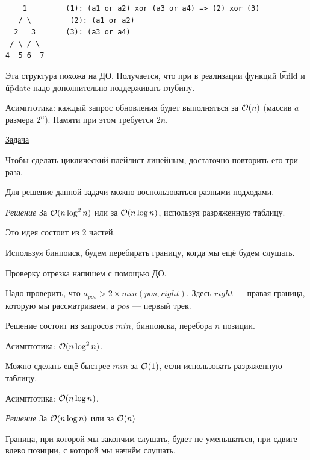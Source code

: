 \begin{verbatim}
    1         (1): (a1 or a2) xor (a3 or a4) => (2) xor (3)
   / \	       (2): (a1 or a2) 
  2   3       (3): (a3 or a4)
 / \ / \
4  5 6  7      
\end{verbatim}

Эта структура похожа на ДО. Получается, что при в реализации функций \t{build} и \t{update} надо дополнительно поддерживать глубину.

Асимптотика: каждый запрос обновления будет выполняться за $\mathcal{O}(n)$ (массив $a$ размера $2^n$). Памяти при этом требуется $2n$.

\pagebreak


\href{https://codeforces.com/problemset/problem/1237/D}{Задача}

Чтобы сделать циклический плейлист линейным, достаточно повторить его три раза.

Для решение данной задачи можно воспользоваться разными подходами. 

{\it Решение } За $ \mathcal{O}(n \log^2 n)$ или за $\mathcal{O}(n \log n)$, используя разряженную таблицу.

Это идея состоит из 2 частей.
\up \up
\begin{MyList}[0pt]
	\item Используя бинпоиск, будем перебирать границу, когда мы ещё будем слушать.
	\item Проверку отрезка напишем с помощью ДО.
	
	Надо проверить, что $a_{pos} > 2 \times min(pos, right)$. Здесь $right$ --- правая граница, которую мы рассматриваем, а $pos$ --- первый трек.
\end{MyList}
\up \up
Решение состоит из запросов $min$, бинпоиска, перебора $n$ позиции.

Асимптотика: $ \mathcal{O}(n \log^2 n)$.
\down

Можно сделать ещё быстрее $min$ за $\mathcal{O}(1)$, если использовать разряженную таблицу.

Асимптотика: $\mathcal{O}(n \log n)$. \href{https://codeforces.com/contest/1237/submission/62698504}{} \href{https://codeforces.com/contest/1237/submission/63401681}{}

\down

{\it Решение } За $ \mathcal{O}(n \log n)$ или за $\mathcal{O}(n)$ \href{https://codeforces.com/contest/1237/submission/62704110}{}

\begin{Prop}Граница, при которой мы закончим слушать, будет не уменьшаться, при сдвиге влево позиции, с которой мы начнём слушать.\end{Prop}

